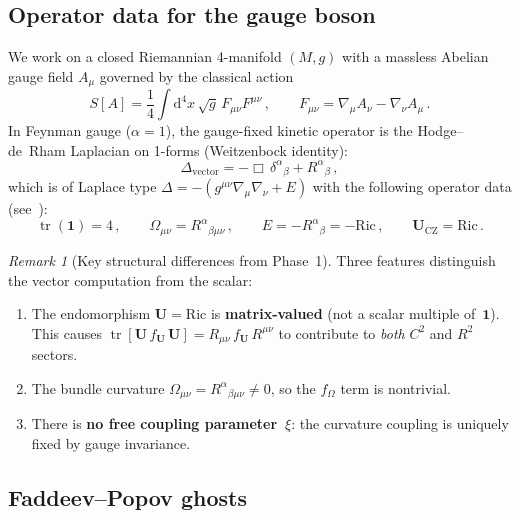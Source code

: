 \documentclass[11pt,a4paper]{article}
\newcommand{\Id}{\mathbf{1}}
\newcommand{\tr}{\operatorname{tr}}
\newcommand{\dd}{\mathrm{d}}
\theoremstyle{definition}
\theoremstyle{remark}
\newtheorem{remark}[theorem]{Remark}
\begin{document}
\subsection{Operator data for the gauge boson}

We work on a closed Riemannian 4-manifold $(M,g)$ with a massless
Abelian gauge field $A_\mu$ governed by the classical action
\begin{equation}
  S[A] = \frac{1}{4}\int \dd^4 x\,\sqrt{g}\,F_{\mu\nu}F^{\mu\nu}\,,
  \qquad F_{\mu\nu} = \nabla_\mu A_\nu - \nabla_\nu A_\mu\,.
  \label{eq:vector-action}
\end{equation}
In Feynman gauge ($\alpha = 1$), the gauge-fixed kinetic operator is
the Hodge--de~Rham Laplacian on 1-forms (Weitzenbock identity):
\begin{equation}
  \Delta_{\mathrm{vector}} = -\Box\,\delta^\alpha{}_\beta
    + R^\alpha{}_\beta\,,
  \label{eq:vector-operator}
\end{equation}
which is of Laplace type $\Delta = -(g^{\mu\nu}\nabla_\mu\nabla_\nu + E)$
with the following operator data (see~\cite{NT1b_vector_conventions}):
\begin{equation}
  \boxed{
  \tr(\Id) = 4\,,\qquad
  \Omega_{\mu\nu} = R^\alpha{}_{\beta\mu\nu}\,,\qquad
  E = -R^\alpha{}_\beta = -\mathrm{Ric}\,,\qquad
  \mathbf{U}_{\mathrm{CZ}} = \mathrm{Ric}\,.
  }
  \label{eq:operator-data}
\end{equation}

\begin{remark}[Key structural differences from Phase~1]
\label{rem:differences}
Three features distinguish the vector computation from the scalar:
\begin{enumerate}[nosep]
\item The endomorphism $\mathbf{U} = \mathrm{Ric}$ is
  \textbf{matrix-valued} (not a scalar multiple of~$\Id$).
  This causes $\tr[\mathbf{U}\,f_{\mathbf{U}}\,\mathbf{U}]
  = R_{\mu\nu}\,f_{\mathbf{U}}\,R^{\mu\nu}$ to contribute to
  \emph{both} $C^2$ and $R^2$ sectors.
\item The bundle curvature $\Omega_{\mu\nu} = R^\alpha{}_{\beta\mu\nu}
  \neq 0$, so the $f_\Omega$ term is nontrivial.
\item There is \textbf{no free coupling parameter~$\xi$}:
  the curvature coupling is uniquely fixed by gauge invariance.
\end{enumerate}
\end{remark}


\subsection{Faddeev--Popov ghosts}
\end{document}
